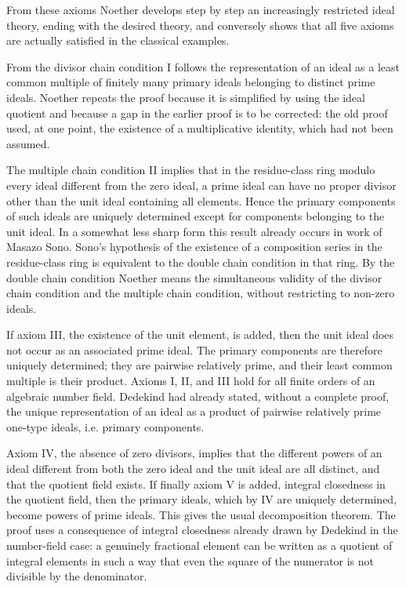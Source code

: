 \documentclass[11pt]{article}
\begin{document}
From these axioms Noether develops step by step an increasingly restricted ideal theory, ending with the desired theory, and conversely shows that all five axioms are actually satisfied in the classical examples.

From the divisor chain condition I follows the representation of an ideal as a least common multiple of finitely many primary ideals belonging to distinct prime ideals. Noether repeats the proof because it is simplified by using the ideal quotient and because a gap in the earlier proof is to be corrected: the old proof used, at one point, the existence of a multiplicative identity, which had not been assumed.

The multiple chain condition II implies that in the residue-class ring modulo every ideal different from the zero ideal, a prime ideal can have no proper divisor other than the unit ideal containing all elements. Hence the primary components of such ideals are uniquely determined except for components belonging to the unit ideal. In a somewhat less sharp form this result already occurs in work of Masazo Sono. Sono's hypothesis of the existence of a composition series in the residue-class ring is equivalent to the double chain condition in that ring. By the double chain condition Noether means the simultaneous validity of the divisor chain condition and the multiple chain condition, without restricting to non-zero ideals.

If axiom III, the existence of the unit element, is added, then the unit ideal does not occur as an associated prime ideal. The primary components are therefore uniquely determined; they are pairwise relatively prime, and their least common multiple is their product. Axioms I, II, and III hold for all finite orders of an algebraic number field. Dedekind had already stated, without a complete proof, the unique representation of an ideal as a product of pairwise relatively prime one-type ideals, i.e. primary components.

Axiom IV, the absence of zero divisors, implies that the different powers of an ideal different from both the zero ideal and the unit ideal are all distinct, and that the quotient field exists. If finally axiom V is added, integral closedness in the quotient field, then the primary ideals, which by IV are uniquely determined, become powers of prime ideals. This gives the usual decomposition theorem. The proof uses a consequence of integral closedness already drawn by Dedekind in the number-field case: a genuinely fractional element can be written as a quotient of integral elements in such a way that even the square of the numerator is not divisible by the denominator.
\end{document}
